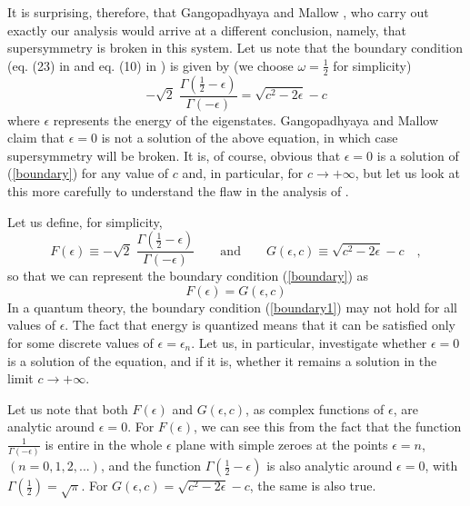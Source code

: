 \documentclass[a4paper,amssymb,aps]{revtex4}
\begin{document}
It is surprising, therefore, that Gangopadhyaya and Mallow
\cite{asim}, who carry out exactly our analysis would
arrive at 
a different conclusion, namely, that supersymmetry is broken in this
system. Let us note that the boundary condition (eq. (23) in
\cite{das} and eq. (10) in \cite{asim}) is given by (we choose
$\omega = \frac{1}{2}$ for simplicity)
\begin{equation}
- \sqrt{2}\;\frac{\Gamma(\frac{1}{2}-\epsilon)}{\Gamma (-\epsilon)} =
\sqrt{c^{2}-2\epsilon} - c\label{boundary}
\end{equation}
where $\epsilon$ represents the energy of the
eigenstates. Gangopadhyaya and Mallow claim that $\epsilon = 0$ is not
a solution of the above equation, in which case 
supersymmetry will be broken. It is, of course, obvious that $\epsilon
= 0$ is a solution of (\ref{boundary}) for any value of $c$ and, in
particular, for $c\rightarrow +\infty$, but let us look at this more
carefully to understand the flaw in the analysis of \cite{asim}.

Let us define, for simplicity,
\begin{equation}
F(\epsilon) \equiv - \sqrt{2}\; \frac{ \Gamma (\frac{1}{2} - \epsilon)}{\Gamma
(-\epsilon)} \qquad {\mathrm{and}} \qquad  G(\epsilon, c) \equiv \sqrt{c^2 - 2
\epsilon} - c \quad ,
\end{equation}
so that we can represent the boundary condition (\ref{boundary}) as
\begin{equation}
F(\epsilon) = G (\epsilon,c)\label{boundary1}
\end{equation}
In a quantum theory, the boundary condition (\ref{boundary1}) may not
hold for all values of $\epsilon$.  The fact that energy is quantized means
that it can be satisfied only for some discrete values of
$\epsilon=\epsilon_{n}$.   Let us, in
particular, investigate whether $\epsilon = 0$ is a solution of the
equation, and if it is, whether it remains a solution
in the limit $c \rightarrow +\infty$.

Let us note that both $F(\epsilon)$ and $G(\epsilon,c)$, as complex
functions  of $\epsilon$, 
are analytic around $\epsilon=0$.  For $F(\epsilon)$, we can see this
from the fact
that the function $\frac{1}{\Gamma (-\epsilon)}$ is entire in the
whole $\epsilon$ 
plane with simple zeroes at the points $\epsilon = n$, $(n = 0,1,2,...)$,
and the function $\Gamma (\frac{1}{2} - \epsilon)$ is also analytic around
$\epsilon=0$,
with $\Gamma (\frac{1}{2}) = \sqrt{\pi}$. For $G(\epsilon,c)=
\sqrt{c^2 - 2 \epsilon} -c $, the same is also true.
\end{document}
